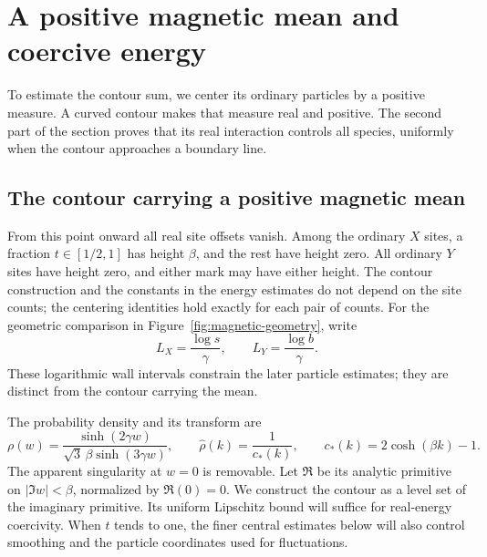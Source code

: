 \section{A positive magnetic mean and coercive energy}
\label{sec:magnetic-mean}

To estimate the contour sum, we center its ordinary particles by a
positive measure. A curved contour makes that measure real and positive.
The second part of the section proves that its real interaction controls
all species, uniformly when the contour approaches a boundary line.

\subsection{The contour carrying a positive magnetic mean}

From this point onward all real site offsets vanish.  Among the
ordinary \(X\) sites, a fraction \(t\in[1/2,1]\) has height
\(\beta\), and the rest have height zero.  All ordinary \(Y\) sites
have height zero, and either mark may have either height.  The contour
construction and the constants in the energy estimates do not depend on
the site counts; the centering identities hold exactly for each pair of
counts.  For the geometric comparison in
Figure~\ref{fig:magnetic-geometry}, write
\[
 L_X=\frac{\log s}{\gamma},\qquad L_Y=\frac{\log b}{\gamma}.
\]
These logarithmic wall intervals constrain the later particle estimates;
they are distinct from the contour carrying the mean.


The probability density and its transform are
\[
 \rho(w)=\frac{\sinh(2\gamma w)}
 {\sqrt3\,\beta\sinh(3\gamma w)},\qquad
 \widehat\rho(k)=\frac1{c_*(k)},\qquad
 c_*(k)=2\cosh(\beta k)-1 .
\]
The apparent singularity at \(w=0\) is removable.
Let \(\mathfrak R\) be its analytic primitive on
\(|\Im w|<\beta\), normalized by \(\mathfrak R(0)=0\).
We construct the contour as a level set of the imaginary primitive.
Its uniform Lipschitz bound will suffice for real-energy coercivity.
When \(t\) tends to one, the finer central estimates below will also
control smoothing and the particle coordinates used for fluctuations.

